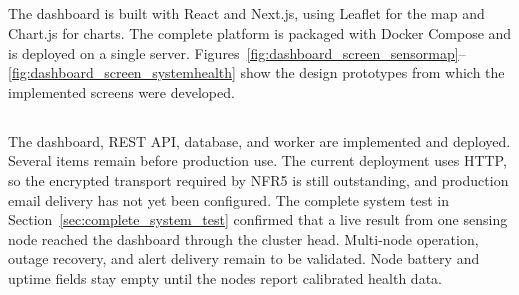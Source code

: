 \subsection{}
The dashboard is built with React and Next.js, using Leaflet for the map and Chart.js for charts. The complete platform is packaged with Docker Compose and is deployed on a single server. Figures~\ref{fig:dashboard_screen_sensormap}--\ref{fig:dashboard_screen_systemhealth} show the design prototypes from which the implemented screens were developed.

\subsection{}
The dashboard, REST API, database, and worker are implemented and deployed. Several items remain before production use. The current deployment uses HTTP, so the encrypted transport required by NFR5 is still outstanding, and production email delivery has not yet been configured. The complete system test in Section~\ref{sec:complete_system_test} confirmed that a live result from one sensing node reached the dashboard through the cluster head. Multi-node operation, outage recovery, and alert delivery remain to be validated. Node battery and uptime fields stay empty until the nodes report calibrated health data.

\endgroup
